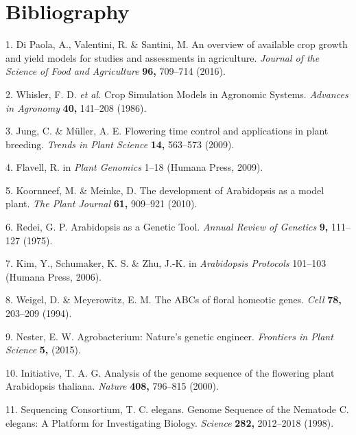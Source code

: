 \documentclass[12pt,]{book}
\begin{document}
\chapter*{Bibliography}\label{chapter:bibliography}

\hypertarget{refs}{}
\hypertarget{ref-di_paola_overview_2016}{}
1. Di Paola, A., Valentini, R. \& Santini, M. An overview of available
crop growth and yield models for studies and assessments in agriculture.
\emph{Journal of the Science of Food and Agriculture} \textbf{96,}
709--714 (2016).

\hypertarget{ref-whisler_crop_1986}{}
2. Whisler, F. D. \emph{et al.} Crop Simulation Models in Agronomic
Systems. \emph{Advances in Agronomy} \textbf{40,} 141--208 (1986).

\hypertarget{ref-jung_flowering_2009}{}
3. Jung, C. \& Müller, A. E. Flowering time control and applications in
plant breeding. \emph{Trends in Plant Science} \textbf{14,} 563--573
(2009).

\hypertarget{ref-flavell_role_2009}{}
4. Flavell, R. in \emph{Plant Genomics} 1--18 (Humana Press, 2009).

\hypertarget{ref-koornneef_development_2010}{}
5. Koornneef, M. \& Meinke, D. The development of Arabidopsis as a model
plant. \emph{The Plant Journal} \textbf{61,} 909--921 (2010).

\hypertarget{ref-redei_arabidopsis_1975}{}
6. Redei, G. P. Arabidopsis as a Genetic Tool. \emph{Annual Review of
Genetics} \textbf{9,} 111--127 (1975).

\hypertarget{ref-kim_ems_2006}{}
7. Kim, Y., Schumaker, K. S. \& Zhu, J.-K. in \emph{Arabidopsis
Protocols} 101--103 (Humana Press, 2006).

\hypertarget{ref-weigel_abcs_1994}{}
8. Weigel, D. \& Meyerowitz, E. M. The ABCs of floral homeotic genes.
\emph{Cell} \textbf{78,} 203--209 (1994).

\hypertarget{ref-nester_agrobacterium_2015}{}
9. Nester, E. W. Agrobacterium: Nature's genetic engineer.
\emph{Frontiers in Plant Science} \textbf{5,} (2015).

\hypertarget{ref-the_arabidopsis_genome_initiative_analysis_2000}{}
10. Initiative, T. A. G. Analysis of the genome sequence of the
flowering plant Arabidopsis thaliana. \emph{Nature} \textbf{408,}
796--815 (2000).

\hypertarget{ref-the_celegans_sequencing_consortium_genome_1998}{}
11. Sequencing Consortium, T. C. elegans. Genome Sequence of the
Nematode C. elegans: A Platform for Investigating Biology.
\emph{Science} \textbf{282,} 2012--2018 (1998).
\end{document}
